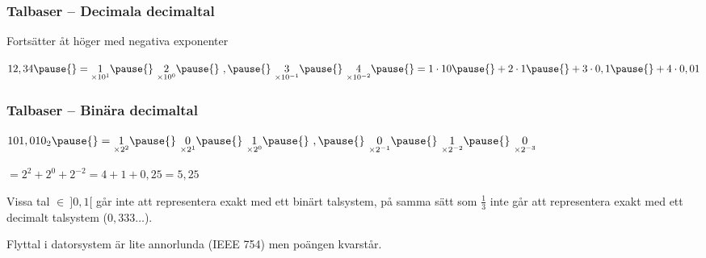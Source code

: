 \documentclass{beamer}
\begin{document}
  \begin{frame}
    \frametitle{Talbaser -- Decimala decimaltal}

    \pause{}

    Fortsätter åt höger med negativa exponenter

    \pause{}

    \(12,34 \pause{} = \underset{\times 10^1}{1} \pause{}\ \underset{\times 10^0}{2} \pause{}\ , \pause{}\ \underset{\times 10^{-1}}{3} \pause{}\ \underset{\times 10^{-2}}{4} \pause{} = 1 \cdot 10 \pause{} + 2 \cdot 1 \pause{} + 3 \cdot 0,1 \pause{} + 4 \cdot 0,01\)

  \end{frame}

  \begin{frame}
    \frametitle{Talbaser -- Binära decimaltal}

    \pause{}

    \(101,010_2 \pause{} = \underset{\times 2^2}{1} \pause{}\ \underset{\times 2^1}{0} \pause{}\ \underset{\times 2^0}{1} \pause{}\ , \pause{}\ \underset{\times 2^{-1}}{0} \pause{}\ \underset{\times 2^{-2}}{1} \pause{}\ \underset{\times 2^{-3}}{0}\)

    \pause{}

    \vspace{-0.5em}

    \(= 2^2 + 2^0 + 2^{-2} = 4 + 1 + 0,25 = 5,25 \)

    \pause{}

    Vissa tal \(\in \ ]0, 1[\) går inte att representera exakt med ett binärt
    talsystem, på samma sätt som \(\frac{1}{3}\) inte går att representera exakt
    med ett decimalt talsystem (\(0,333\dots\)).

    \pause{}

    Flyttal i datorsystem är lite annorlunda (IEEE 754) men poängen kvarstår.

  \end{frame}
\end{document}
